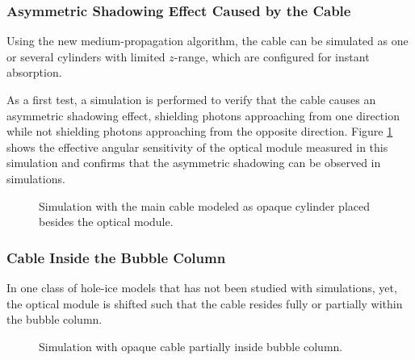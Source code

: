 \subsubsection{Asymmetric Shadowing Effect Caused by the Cable}

Using the new medium-propagation algorithm, the cable can be simulated
as one or several cylinders with limited \(z\)-range, which are
configured for instant absorption.

As a first test, a simulation is performed to verify that the cable
causes an asymmetric shadowing effect, shielding photons approaching
from one direction while not shielding photons approaching from the
opposite direction. Figure \ref{fig:ochoCh7o} shows the effective
angular sensitivity of the optical module measured in this simulation
and confirms that the asymmetric shadowing can be observed in
simulations.


\begin{figure}[htbp]
  \hfill
  \caption{Simulation with the main cable modeled as opaque cylinder placed besides the optical module.}
  \label{fig:ochoCh7o}
\end{figure}

\subsubsection{Cable Inside the Bubble Column}

In one class of hole-ice models that has not been studied with
simulations, yet, the optical module is shifted such that the cable
resides fully or partially within the bubble column.
\cite{martinspicehddard}

\begin{figure}[htbp]
  \hfill
  \hfill
  \caption{Simulation with opaque cable partially inside bubble column.}
  \label{fig:caweNg6o}
\end{figure}

